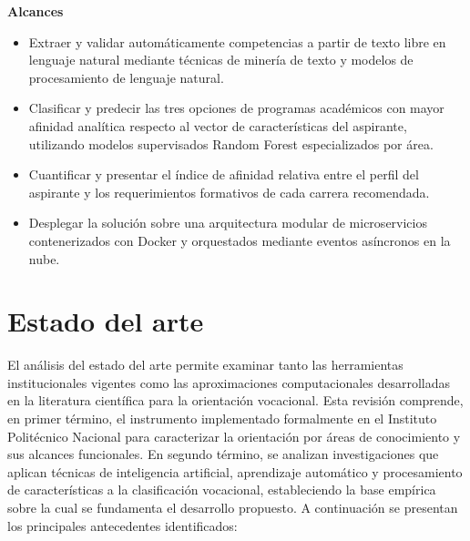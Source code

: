 \medskip

\textbf{Alcances}

\begin{itemize}
    \item Extraer y validar automáticamente competencias a partir de texto libre en lenguaje natural mediante técnicas de minería de texto y modelos de procesamiento de lenguaje natural.
    \item Clasificar y predecir las tres opciones de programas académicos con mayor afinidad analítica respecto al vector de características del aspirante, utilizando modelos supervisados Random Forest especializados por área.
    \item Cuantificar y presentar el índice de afinidad relativa entre el perfil del aspirante y los requerimientos formativos de cada carrera recomendada.
    \item Desplegar la solución sobre una arquitectura modular de microservicios contenerizados con Docker y orquestados mediante eventos asíncronos en la nube.
\end{itemize}

\section{Estado del arte}

El análisis del estado del arte permite examinar tanto las herramientas institucionales vigentes como las aproximaciones computacionales desarrolladas en la literatura científica para la orientación vocacional. Esta revisión comprende, en primer término, el instrumento implementado formalmente en el Instituto Politécnico Nacional para caracterizar la orientación por áreas de conocimiento y sus alcances funcionales. En segundo término, se analizan investigaciones que aplican técnicas de inteligencia artificial, aprendizaje automático y procesamiento de características a la clasificación vocacional, estableciendo la base empírica sobre la cual se fundamenta el desarrollo propuesto. A continuación se presentan los principales antecedentes identificados:

